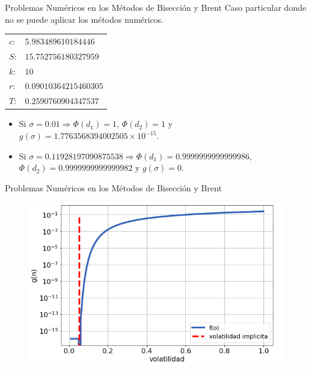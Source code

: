 \documentclass{beamer}
\begin{document}
\begin{frame}{Problemas Num\'ericos en los M\'etodos de Bisecci\'on y Brent}
  Caso particular donde no se puede aplicar los m\'etodos num\'ericos.
  \begin{table}[!htbp]
    \centering
    \begin{tabular}{|ll|}
      \hline
      $c$: & $5.983489610184446$  \\ 
      $S$: & $15.752756180327959$  \\             %
      $k$: & $10$   \\ %
      $r$: & $0.09010364215460305$ \\               %
      $T$: & $0.2590760904347537$  \\ \hline
    \end{tabular}
  \end{table}

  \begin{itemize}
    \item Si $\sigma = 0.01 \Rightarrow \Phi(d_1) = 1$, $\Phi(d_2) = 1$ y $g(\sigma) = 1.7763568394002505\times10^{-15}$.
    \item Si $\sigma = 0.11928197090875538 \Rightarrow \Phi(d_1) = 0.9999999999999986$, $\Phi(d_2) = 0.9999999999999982$ y $g(\sigma) = 0$.
  \end{itemize}

\end{frame}

\begin{frame}{Problemas Num\'ericos en los M\'etodos de Bisecci\'on y Brent}

    \begin{figure}[!tbp]
        \includegraphics[scale=0.5]{g}
    \end{figure}

\end{frame}
\end{document}
